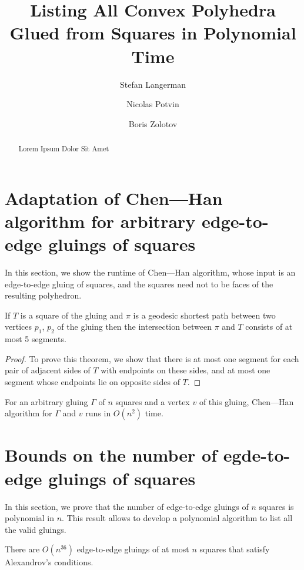 \documentclass[a4paper,USenglish,cleveref, autoref, thm-restate]{socg-lipics-v2019}
\title{Listing All Convex Polyhedra Glued from Squares in Polynomial Time}
\author{Stefan Langerman}{Faculté des Sciences, Université Libre de Bruxelles}{stefan.langerman@ulb.ac.be}{ }{Whatever grant}
\author{Nicolas Potvin}{Faculté des Sciences, Université Libre de Bruxelles}{potvinnicolas2@gmail.com}{ }{Whatever grant}
\author{Boris Zolotov}{Department of Mathematics and Computer Sciences, St. Petersburg State University}{boris.a.zolotov@yandex.com}{ }{Whatever grant}
\begin{document}
\maketitle

\begin{abstract} Lorem Ipsum Dolor Sit Amet \end{abstract}

\section{Adaptation of Chen—Han algorithm for arbitrary edge-to-edge gluings of squares}

In this section, we show the runtime of Chen—Han algorithm, whose input is an edge-to-edge gluing of squares, and the squares need not to be faces of the resulting polyhedron.

\begin{theorem} \label{thm:shortestSquare}
	If $T$ is a square of the gluing and $\pi$ is a geodesic shortest path between two vertices $p_1$, $p_2$ of the gluing then the intersection between $\pi$ and $T$ consists of at most 5 segments.
\end{theorem}

\begin{proof}
	To prove this theorem, we show that there is at most one segment for each pair of adjacent sides of $T$ with endpoints on these sides, and at most one segment whose endpoints lie on opposite sides of $T$.
\end{proof}

\begin{corollary} \label{cor:chruntime}
	For an arbitrary gluing $\Gamma$ of $n$ squares and a vertex $v$ of this gluing, Chen—Han algorithm for $\Gamma$ and $v$ runs in $O(n^2)$ time.
\end{corollary}

\section{Bounds on the number of egde-to-edge gluings of squares}

In this section, we prove that the number of edge-to-edge gluings of $n$ squares is polynomial in $n$. This result allows to develop a polynomial algorithm to list all the valid gluings.

\begin{theorem} \label{thm:n36}
	There are $O \left( n^{36} \right)$ edge-to-edge gluings of at most $n$ squares that satisfy Alexandrov's conditions.
\end{theorem}
\end{document}
